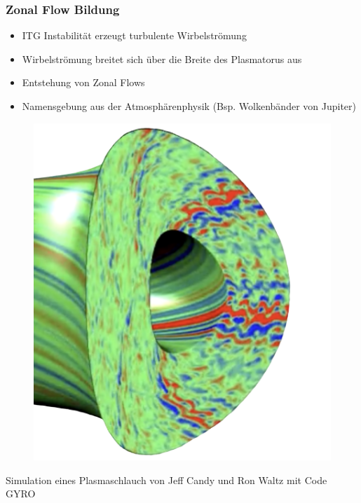 \documentclass[compress,aspectratio=169]{beamer}
\begin{document}
	\begin{frame}
		\frametitle{Zonal Flow Bildung}
		\begin{minipage}{0.6\textwidth}\raggedleft
			\centering
			\begin{itemize}
				\item ITG Instabilität erzeugt turbulente Wirbelströmung
				\item Wirbelströmung breitet sich über die Breite des Plasmatorus aus
				\item Entstehung von \alert{Zonal Flows}
				\item Namensgebung aus der Atmosphärenphysik (Bsp. Wolkenbänder von Jupiter)
			\end{itemize}
		\end{minipage}
		\begin{minipage}{0.3\textwidth}
			\begin{figure}%
				\href{https://www.youtube.com/watch?v=O6tUHzfj-zM}{\includegraphics[width=\textwidth]{Presentation/turbulence.png}}
			\end{figure}
			{\tiny Simulation eines Plasmaschlauch von Jeff Candy und Ron Waltz mit Code GYRO}
		\end{minipage}
	\end{frame}
\end{document}
